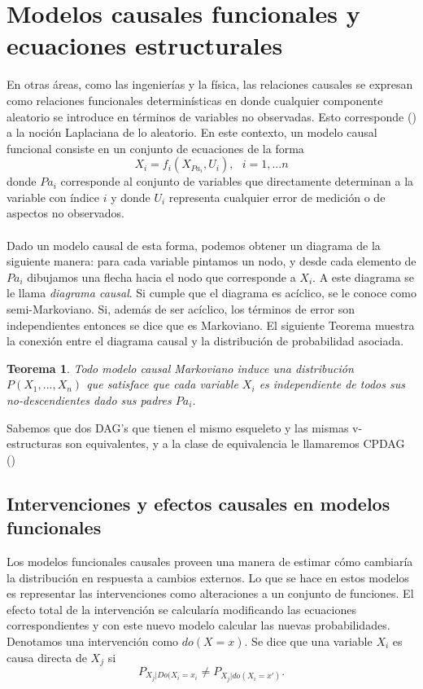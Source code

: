 \documentclass[11pt]{article}
\theoremstyle{plain}
\newtheorem{teo}{Teorema}
\begin{document}
\section{Modelos causales funcionales y ecuaciones estructurales}
En otras áreas, como las ingenierías y la física, las relaciones causales se expresan como relaciones funcionales determinísticas en donde cualquier componente aleatorio se introduce en términos de variables no observadas. Esto corresponde (\cite{pearl2009causality}) a la noción Laplaciana de lo aleatorio. En este contexto, un modelo causal funcional consiste en un conjunto de ecuaciones de la forma
\[ X_i = f_i (X_{Pa_i},U_i), \textrm{  } i=1,...n\]
donde $Pa_i$ corresponde al conjunto de variables que directamente determinan a la variable con índice $i$ y donde $U_i$ representa cualquier error de medición o de aspectos no observados.\\
\\
Dado un modelo causal de esta forma, podemos obtener un diagrama de la siguiente manera: para cada variable pintamos un nodo, y desde cada elemento de $Pa_i$ dibujamos una flecha hacia el nodo que corresponde a $X_i$. A este diagrama se le llama \textit{diagrama causal}. Si cumple que el diagrama es acíclico, se le conoce como semi-Markoviano. Si, además de ser acíclico, los términos de error son independientes entonces se dice que es Markoviano. El siguiente Teorema muestra la conexión entre el diagrama causal y la distribución de probabilidad asociada. 
\begin{teo}
Todo modelo causal Markoviano induce una distribución $P(X_1,...,X_n)$ que satisface que cada variable $X_i$ es independiente de todos sus no-descendientes dado sus padres $Pa_i$.
\end{teo}
Sabemos que dos DAG's que tienen el mismo esqueleto y las mismas v-estructuras son equivalentes, y a la clase de equivalencia le llamaremos CPDAG (\cite{goudet2017learning})
\subsection{Intervenciones y efectos causales en modelos funcionales}
Los modelos funcionales causales proveen una manera de estimar cómo cambiaría la distribución en respuesta a cambios externos. Lo que se hace en estos modelos es representar las intervenciones como alteraciones a un conjunto de funciones. El efecto total de la intervención se calcularía modificando las ecuaciones correspondientes y con este nuevo modelo calcular las nuevas probabilidades. Denotamos una intervención como $do(X=x)$. Se dice que una variable $X_i$ es causa directa de $X_j$ si
\[ P_{X_j | Do(X_i = x_i} \neq P_{X_j | do(X_i = x')}. \]
\end{document}
